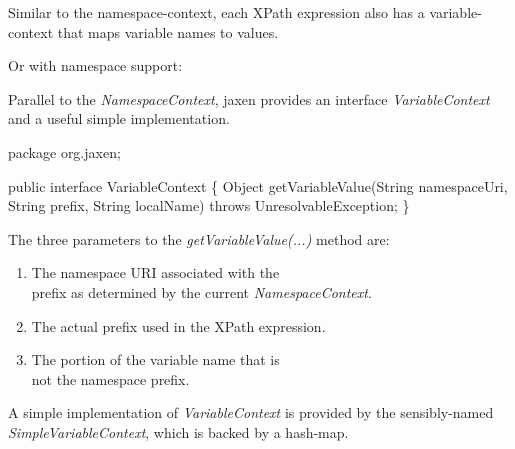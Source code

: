 \documentclass[20pt,landscape,headrule,footrule]{foils}
\begin{document}
Similar to the namespace-context, each XPath expression also has a 
variable-context that maps variable names to values.


Or with namespace support:




Parallel to the \emph{NamespaceContext}, jaxen provides an
interface \emph{VariableContext} and a useful simple implementation.

\begin{codelisting}
package org.jaxen;

public interface VariableContext
\{
    Object getVariableValue(String namespaceUri,
                            String prefix,
                            String localName)
        throws UnresolvableException;
\}
\end{codelisting}

The three parameters to the \emph{getVariableValue(...)}
method are:

\begin{minipage}{\textwidth}
\small
\begin{enumerate}
  \item {} The namespace URI associated with the\\
    prefix as determined by the current \emph{NamespaceContext}.
  \item {} The actual prefix used in the XPath expression.
  \item {} The portion of the variable name that is\\ 
    not the namespace prefix.
\end{enumerate}
\end{minipage}




A simple implementation of \emph{VariableContext} is provided by 
the sensibly-named \emph{SimpleVariableContext}, which is backed
by a hash-map.
\end{document}
